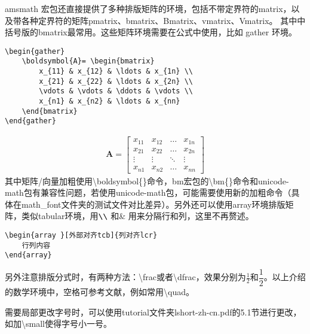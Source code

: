 amsmath 宏包还直接提供了多种排版矩阵的环境，包括不带定界符的matrix，以及带各种定界符的矩阵pmatrix、bmatrix、Bmatrix、vmatrix、Vmatrix。
其中中括号版的bmatrix最常用。这些矩阵环境需要在公式中使用，比如 gather 环境。
\begin{lstlisting}
\begin{gather}
	\boldsymbol{A}= \begin{bmatrix}
		x_{11} & x_{12} & \ldots & x_{1n} \\
		x_{21} & x_{22} & \ldots & x_{2n} \\
		\vdots & \vdots & \ddots & \vdots \\
		x_{n1} & x_{n2} & \ldots & x_{nn}
	\end{bmatrix}
\end{gather}
\end{lstlisting}
\begin{gather}
\boldsymbol{A}= \begin{bmatrix}
	x_{11} & x_{12} & \ldots & x_{1n} \\
	x_{21} & x_{22} & \ldots & x_{2n} \\
	\vdots & \vdots & \ddots & \vdots \\
	x_{n1} & x_{n2} & \ldots & x_{nn}
   \end{bmatrix}
\end{gather}	
其中矩阵/向量加粗使用\textbackslash{}boldsymbol\{\}命令，bm宏包的\textbackslash{}bm\{\}命令和unicode-math包有兼容性问题，若使用unicode-math包，可能需要使用新的加粗命令（具体在math\_font文件夹的测试文件对比差异）。另外还可以使用array环境排版矩阵，类似tabular环境，用$ \verb|\\|$ 和\& 用来分隔行和列，这里不再赘述。	
\begin{lstlisting}
\begin{array }[外部对齐tcb]{列对齐lcr}
	行列内容
\end{array}
\end{lstlisting}

另外注意排版分式时，有两种方法：\textbackslash{}frac或者\textbackslash{}dfrac，效果分别为$ \frac{1}{2} $和$ \dfrac{1}{2} $。以上介绍的数学环境中，空格可参考文献\parencite{_c}，例如常用\textbackslash{}quad。

需要局部更改字号时，可以使用tutorial文件夹lshort-zh-cn.pdf的5.1节进行更改，如加\textbackslash{}small使得字号小一号。
